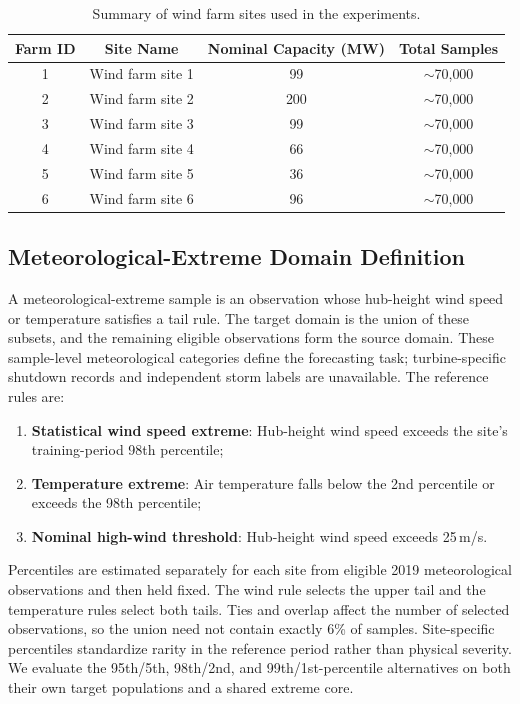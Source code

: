 \begin{table}[ht]
\centering
\caption{Summary of wind farm sites used in the experiments.}
\setlength{\tabcolsep}{4mm}
\begin{tabular}{cccc}
\toprule
Farm ID & Site Name & Nominal Capacity (MW) & Total Samples \\
\midrule
1 & Wind farm site 1 & 99  & $\sim$70{,}000 \\
2 & Wind farm site 2 & 200 & $\sim$70{,}000 \\
3 & Wind farm site 3 & 99  & $\sim$70{,}000 \\
4 & Wind farm site 4 & 66  & $\sim$70{,}000 \\
5 & Wind farm site 5 & 36  & $\sim$70{,}000 \\
6 & Wind farm site 6 & 96  & $\sim$70{,}000 \\
\bottomrule
\end{tabular}
\label{tab:farm_summary}
\end{table}

\subsection{Meteorological-Extreme Domain Definition}\label{sec:extreme_def}

{\color{blue}A meteorological-extreme sample is an observation whose hub-height wind speed or temperature satisfies a tail rule. The target domain is the union of these subsets, and the remaining eligible observations form the source domain. These sample-level meteorological categories define the forecasting task; turbine-specific shutdown records and independent storm labels are unavailable. The reference rules are:}

\begin{enumerate}
    \item \textbf{Statistical wind speed extreme}: {\color{blue}Hub-height wind speed exceeds the site's training-period 98th percentile;}
    \item \textbf{Temperature extreme}: Air temperature falls below the 2nd percentile or exceeds the 98th percentile;
    \item {\color{blue}\textbf{Nominal high-wind threshold}: Hub-height wind speed exceeds 25\,m/s.}
\end{enumerate}

{\color{blue}Percentiles are estimated separately for each site from eligible 2019 meteorological observations and then held fixed. The wind rule selects the upper tail and the temperature rules select both tails. Ties and overlap affect the number of selected observations, so the union need not contain exactly 6\% of samples. Site-specific percentiles standardize rarity in the reference period rather than physical severity. We evaluate the 95th/5th, 98th/2nd, and 99th/1st-percentile alternatives on both their own target populations and a shared extreme core.}

